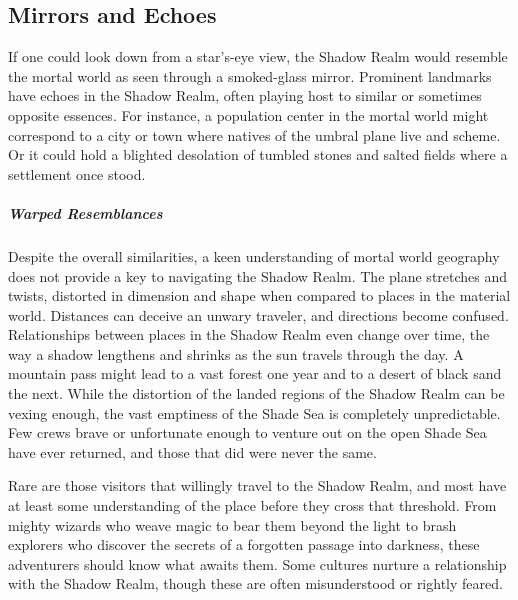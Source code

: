\documentclass[10pt,a4paper,twoside,bg=print,twocolumn,openany,nodeprecatedcode]{dndbook}
\begin{document}
\subsection{Mirrors and Echoes}
If one could look down from a star's-eye view, the Shadow Realm would resemble the mortal world as seen through a smoked-glass mirror. Prominent landmarks have echoes in the Shadow Realm, often playing host to similar or sometimes opposite essences. For instance, a population center in the mortal world might correspond to a city or town where natives of the umbral plane live and scheme. Or it could hold a blighted desolation of tumbled stones and salted fields where a settlement once stood.

\subparagraph{Warped Resemblances}
Despite the overall similarities, a keen understanding of mortal world geography does not provide a key to navigating the Shadow Realm. The plane stretches and twists, distorted in dimension and shape when compared to places in the material world. Distances can deceive an unwary traveler, and directions become confused. Relationships between places in the Shadow Realm even change over time, the way a shadow lengthens and shrinks as the sun travels through the day. A mountain pass might lead to a vast forest one year and to a desert of black sand the next. While the distortion of the landed regions of the Shadow Realm can be vexing enough, the vast emptiness of the Shade Sea is completely unpredictable. Few crews brave or unfortunate enough to venture out on the open Shade Sea have ever returned, and those that did were never the same.

Rare are those visitors that willingly travel to the Shadow Realm, and most have at least some understanding of the place before they cross that threshold. From mighty wizards who weave magic to bear them beyond the light to brash explorers who discover the secrets of a forgotten passage into darkness, these adventurers should know what awaits them. Some cultures nurture a relationship with the Shadow Realm, though these are often misunderstood or rightly feared.
\end{document}
